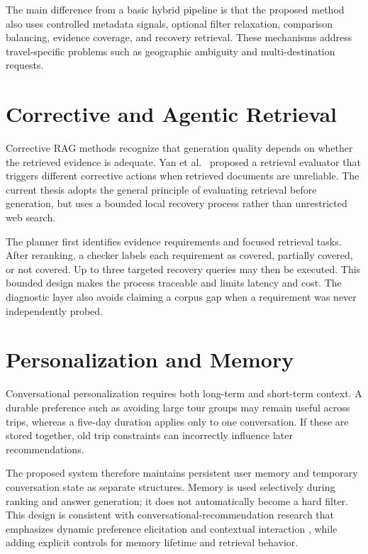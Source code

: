 The main difference from a basic hybrid pipeline is that the proposed method
also uses controlled metadata signals, optional filter relaxation, comparison
balancing, evidence coverage, and recovery retrieval. These mechanisms address
travel-specific problems such as geographic ambiguity and multi-destination
requests.

\section{Corrective and Agentic Retrieval}

Corrective RAG methods recognize that generation quality depends on whether the
retrieved evidence is adequate. Yan et al.~\cite{yan2024crag} proposed a
retrieval evaluator that triggers different corrective actions when retrieved
documents are unreliable. The current thesis adopts the general principle of
evaluating retrieval before generation, but uses a bounded local recovery
process rather than unrestricted web search.

The planner first identifies evidence requirements and focused retrieval tasks.
After reranking, a checker labels each requirement as covered, partially
covered, or not covered. Up to three targeted recovery queries may then be
executed. This bounded design makes the process traceable and limits latency and
cost. The diagnostic layer also avoids claiming a corpus gap when a requirement
was never independently probed.

\section{Personalization and Memory}

Conversational personalization requires both long-term and short-term context.
A durable preference such as avoiding large tour groups may remain useful
across trips, whereas a five-day duration applies only to one conversation. If
these are stored together, old trip constraints can incorrectly influence later
recommendations.

The proposed system therefore maintains persistent user memory and temporary
conversation state as separate structures. Memory is used selectively during
ranking and answer generation; it does not automatically become a hard filter.
This design is consistent with conversational-recommendation research that
emphasizes dynamic preference elicitation and contextual interaction
\cite{jannach2021conversational,gao2021conversational}, while adding explicit
controls for memory lifetime and retrieval behavior.

